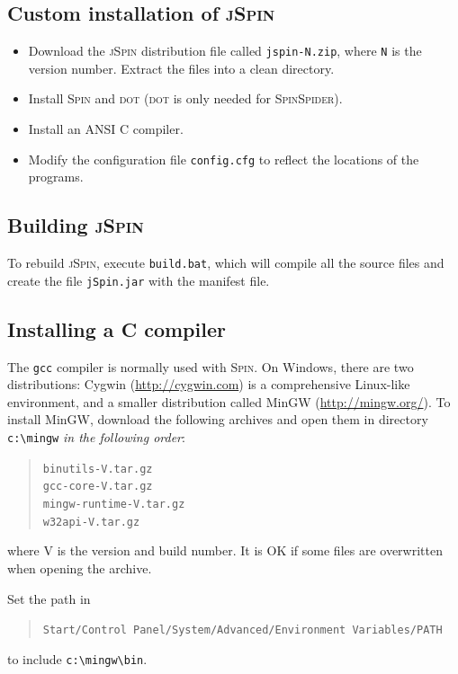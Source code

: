 \documentclass[11pt]{article}
\newcommand{\spn}{\textsc{Spin}}
\newcommand{\js}{\textsc{jSpin}}
\newcommand{\p}[1]{\texttt{#1}}
\begin{document}
\subsection{Custom installation of \js{}}
\begin{itemize}
\item Download the \js{} distribution file called \p{jspin-N.zip},
where \p{N} is the version number.
Extract the files into a clean directory.

\item Install \spn{} and \textsc{dot} (\textsc{dot} is only needed for
\textsc{SpinSpider}).

\item Install an ANSI C compiler.

\item Modify the configuration file \p{config.cfg} to reflect the
locations of the programs.
\end{itemize}

\subsection{Building \js{}}

To rebuild \js{}, execute \p{build.bat}, which will compile all the source
files and create the file \p{jSpin.jar} with the manifest file.

\subsection{Installing a C compiler}\label{a.c}
The \p{gcc} compiler is normally used with \spn{}. On Windows, there are
two distributions: Cygwin (\url{http://cygwin.com}) is a comprehensive
Linux-like environment, and a smaller distribution called MinGW
(\url{http://mingw.org/}). To install MinGW, download the following archives and
open them in directory \verb=c:\mingw= \emph{in the following order}:
\begin{quote}
\p{binutils-V.tar.gz}\\
\p{gcc-core-V.tar.gz}\\
\p{mingw-runtime-V.tar.gz}\\
\p{w32api-V.tar.gz}
\end{quote}
where V is the version and build number.
It is OK if some files are overwritten when opening the archive.

Set the path in
\begin{quote}
\p{Start/Control Panel/System/Advanced/Environment Variables/PATH}
\end{quote}
to include \verb=c:\mingw\bin=.
\end{document}

